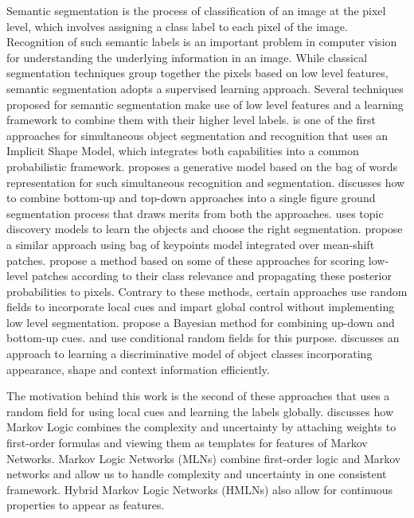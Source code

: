 \documentclass{article} %
\begin{document}
Semantic segmentation is the process of classification of an image at the pixel level, which involves assigning a class label to each pixel of the image. Recognition of such semantic labels is an important problem in computer vision for understanding the underlying information in an image. While classical segmentation techniques group together the pixels based on low level features, semantic segmentation adopts a supervised learning approach. Several techniques proposed for semantic segmentation make use of low level features and a learning framework to combine them with their higher level labels.   \cite{Leibe04combinedobject} is one of the first approaches for simultaneous object segmentation and recognition that uses an Implicit Shape Model, which integrates both capabilities into a common probabilistic framework. \cite{cao:spatially} proposes a generative model based on the bag of words representation for such simultaneous recognition and segmentation. \cite{Borenstein04combiningtop} discusses how to combine bottom-up and top-down approaches into a single figure ground segmentation process that draws merits from both the approaches. \cite{Russell:2006:UMS:1153171.1153637} uses topic discovery models to learn the objects and choose the right segmentation. \cite{lin07multiple} propose a similar approach using bag of keypoints model integrated over mean-shift patches. \cite{conf/bmvc/CsurkaP08} propose a method based on some of these approaches for scoring low-level patches according to their class relevance and propagating these posterior probabilities to pixels. Contrary to these methods, certain approaches use random fields to incorporate local cues and impart global control without implementing low level segmentation. \cite{Kumar:2005:OC:1068507.1068889} propose a Bayesian method for combining up-down and bottom-up cues. \cite{Richard04multiscaleconditional} and \cite{Kumar:2005:HFF:1097115.1097790} use conditional random fields for this purpose. \cite{Shotton06textonboost:joint} discusses an approach to learning a discriminative model of object classes incorporating appearance, shape and context information efficiently. 

The motivation behind this work is the second of these approaches that uses a random field for using local cues and learning the labels globally. \cite{Domingos06unifyinglogical} discusses how Markov Logic combines the complexity and uncertainty by attaching weights to first-order formulas and viewing them as templates for features of Markov Networks. Markov Logic Networks (MLNs) \cite{Richardson06markovlogic} combine first-order logic and Markov networks and allow us to handle complexity and uncertainty in one consistent framework. Hybrid Markov Logic Networks (HMLNs)\cite{Wang_hybridmarkov} also allow for continuous properties to appear as features. 
\end{document}
